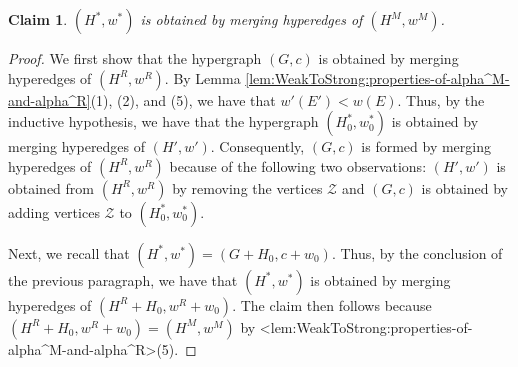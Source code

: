 \documentclass{article}
\def\Cref#1{<#1>}%
\newtheorem{claim}{Claim}[section]
\newcommand{\zeros}{\ensuremath{\mathcal{Z}}\xspace}
\begin{document}

    \begin{claim}\label{claim:WeakToStrong:MergeProperty:H^*w^*-from-H^Mw^M}
        $(H^*, w^*)$ is obtained by merging hyperedges of $(H^M, w^M)$.
    \end{claim}
    \begin{proof}
        We first show that the hypergraph $(G, c)$ is obtained by merging hyperedges of $(H^R, w^R)$.
         By Lemma \ref{lem:WeakToStrong:properties-of-alpha^M-and-alpha^R}(1), (2), and (5), we have that $w'(E') < w(E)$. Thus, by the inductive hypothesis, we have that the hypergraph $(H_0^*, w_0^*)$ is obtained by merging hyperedges of $(H', w')$. Consequently, $(G, c)$ is formed by merging hyperedges of $(H^R, w^R)$ because of the following two observations: $(H', w')$ is obtained from $(H^R, w^R)$ by removing the vertices $\zeros$ and $(G, c)$ is obtained by adding vertices $\zeros$ to $(H_0^*, w_0^*)$.
        
        Next, we recall that $(H^*, w^*) = (G + H_0, c + w_0)$. Thus, by the conclusion of the previous paragraph, we have that $(H^*, w^*)$ is obtained by merging hyperedges of $(H^R + H_0, w^R + w_0)$. The claim then follows because $(H^R + H_0, w^R + w_0) = (H^M, w^M)$ by \Cref{lem:WeakToStrong:properties-of-alpha^M-and-alpha^R}(5).
    \end{proof}
\end{document}

